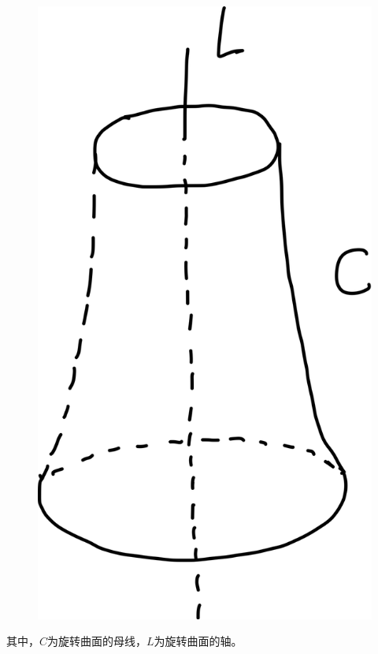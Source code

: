 \documentclass[
	11pt, %
	a4paper, %
]{WhuSakuraBook}
\begin{document}
    \begin{figure}[htbp]
        \centering
        \includegraphics[scale=0.08]{"Chapter 08 images/pic3.png"}
    \end{figure}

    其中，\(C\)为旋转曲面的母线，\(L\)为旋转曲面的轴。
\end{document}
